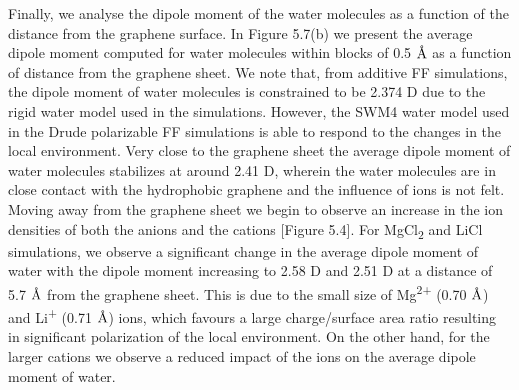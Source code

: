Finally, we analyse the dipole moment of the water molecules as a function of the distance from the graphene surface. In Figure 5.7(b) we present the average dipole moment computed for water molecules within blocks of 0.5 $\text{\normalfont\AA}$ as a function of distance from the graphene sheet. We note that, from additive FF simulations, the dipole moment of water molecules is constrained to be 2.374 D due to the rigid water model used in the simulations. However, the SWM4 water model used in the Drude polarizable FF simulations is able to respond to the changes in the local environment. Very close to the graphene sheet the average dipole moment of water molecules stabilizes at around 2.41 D, wherein the water molecules are in close contact with the hydrophobic graphene and the influence of ions is not felt. Moving away from the graphene sheet we begin to observe an increase in the ion densities of both the anions and the cations [Figure 5.4]. For MgCl\textsubscript{2} and LiCl simulations, we observe a significant change in the average dipole moment of water with the dipole moment increasing to 2.58 D and 2.51 D at a distance of 5.7 $\text{\normalfont\AA}$ from the graphene sheet. This is due to the small size of Mg\textsuperscript{2+} (0.70 $\text{\normalfont\AA}$) and Li\textsuperscript{+} (0.71 $\text{\normalfont\AA}$) ions, which favours a large charge/surface area ratio resulting in significant polarization of the local environment. On the other hand, for the larger cations we observe a reduced impact of the ions on the average dipole moment of water.

